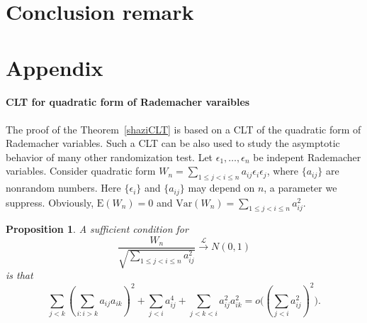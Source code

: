 \documentclass[review]{elsarticle}
\theoremstyle{plain}
\newtheorem{proposition}{\quad\quad Proposition}
\theoremstyle{definition}
\theoremstyle{remark}
\begin{document}
\section{Conclusion remark}

\section{Appendix}
\paragraph{CLT for quadratic form of Rademacher varaibles}
The proof of the Theorem~\ref{shaziCLT} is based on a CLT of the quadratic form of Rademacher variables. 
Such a CLT can be also used to study the asymptotic behavior of many other randomization test.
 Let $\epsilon_1,\ldots,\epsilon_n$ be indepent Rademacher  variables. 
 Consider quadratic form $W_n=\sum_{1\leq j<i\leq n} a_{ij}\epsilon_i \epsilon_j$, where $\{a_{ij}\}$ are nonrandom numbers. Here $\{\epsilon_i\}$ and $\{a_{ij}\}$ may depend on $n$, a parameter we suppress.
 Obviously, $\mathrm{E}(W_n)=0$ and $\mathrm{Var}(W_n)=\sum_{1\leq j<i\leq n} a_{ij}^2$.

 \begin{proposition}\label{CLTprop}
     A sufficient condition for
     \begin{equation}
         \frac{W_n}{\sqrt{\sum_{1\leq j<i\leq n} a_{ij}^2}}\xrightarrow{\mathcal{L}} N(0,1)
     \end{equation}
     is that
     \begin{equation}
         \sum_{j<k}{(\sum_{i:i>k}a_{ij}a_{ik})}^2+
         \sum_{j<i}a_{ij}^4+
         \sum_{j<k<i}a_{ij}^2 a_{ik}^2
         =o\big({(\sum_{j<i} a_{ij}^2)}^2\big).
     \end{equation}
 \end{proposition}
\end{document}
